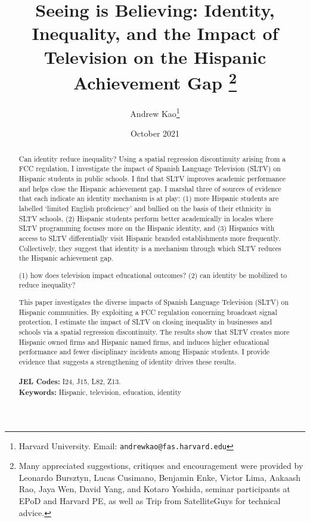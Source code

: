 \documentclass[11pt]{article}
\begin{document}
\title{\textbf{Seeing is Believing: Identity, Inequality, and the Impact of Television on the Hispanic Achievement Gap}%
\thanks{Many appreciated suggestions, critiques and encouragement were provided by Leonardo Bursztyn, Lucas Cusimano, Benjamin Enke, Victor Lima, Aakaash Rao, Jaya Wen, David Yang, and Kotaro Yoshida, seminar participants at EPoD and Harvard PE, as well as Trip from SatelliteGuys for technical advice. }\\
}



\author{Andrew Kao\thanks{Harvard University. Email: \texttt{andrewkao@fas.harvard.edu}} }

\date{October 2021}
{\vspace{-5ex}}


\maketitle

\begin{abstract}
\noindent  Can identity reduce inequality? Using a spatial regression discontinuity arising from a FCC regulation, I investigate the impact of Spanish Language Television (SLTV) on Hispanic students in public schools. I find that SLTV improves academic performance and helps close the Hispanic achievement gap. I marshal three of sources of evidence that each indicate an identity mechanism is at play: (1) more Hispanic students are labelled `limited English proficiency' and bullied on the basis of their ethnicity in SLTV schools, (2) Hispanic students perform better academically in locales where SLTV programming focuses more on the Hispanic identity, and (3) Hispanics with access to SLTV differentially visit Hispanic branded establishments more frequently. Collectively, they suggest that identity is a mechanism through which SLTV reduces the Hispanic achievement gap.


(1) how does television impact educational outcomes?
(2) can identity be mobilized to reduce inequality?

This paper investigates the diverse impacts of Spanish Language Television (SLTV) on Hispanic communities. By exploiting a FCC regulation concerning broadcast signal protection, I estimate the impact of SLTV on closing inequality in businesses and schools via a spatial regression discontinuity. The results show that SLTV creates more Hispanic owned firms and Hispanic named firms, and induces higher educational performance and fewer disciplinary incidents among Hispanic students. I provide evidence that suggests a strengthening of identity drives these results. \\\\
\textbf{JEL Codes:} I24, J15, L82, Z13.\\
\textbf{Keywords:} Hispanic, television, education, identity
\end{abstract}
\end{document}
